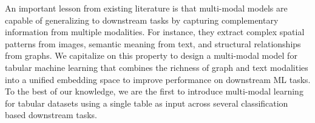 An important lesson from existing literature is that multi-modal models are capable of generalizing to downstream tasks by capturing complementary information from multiple modalities. For instance, they extract complex spatial patterns from images, semantic meaning from text, and structural relationships from graphs.  
We capitalize on this property to design a multi-modal model for tabular machine learning that combines the richness of graph and text modalities into a unified embedding space to improve performance on downstream ML tasks.
To the best of our knowledge, we are the first to introduce multi-modal learning for tabular datasets using a single table as input across several classification based downstream tasks.